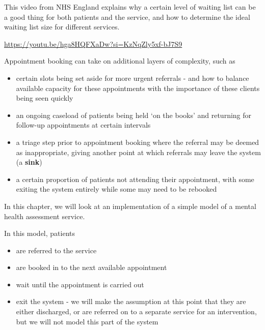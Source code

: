\documentclass[
  letterpaper,
  DIV=11,
  numbers=noendperiod]{scrreprt}
\providecommand{\tightlist}{%
  \setlength{\itemsep}{0pt}\setlength{\parskip}{0pt}}\usepackage{longtable,booktabs,array}
\begin{document}
\begin{tcolorbox}[enhanced jigsaw, rightrule=.15mm, colback=white, colframe=quarto-callout-note-color-frame, colbacktitle=quarto-callout-note-color!10!white, toprule=.15mm, coltitle=black, opacityback=0, titlerule=0mm, bottomtitle=1mm, breakable, title=\textcolor{quarto-callout-note-color}{\faInfo}\hspace{0.5em}{Note}, opacitybacktitle=0.6, toptitle=1mm, arc=.35mm, bottomrule=.15mm, leftrule=.75mm, left=2mm]

This video from NHS England explains why a certain level of waiting list
can be a good thing for both patients and the service, and how to
determine the ideal waiting list size for different services.

\url{https://youtu.be/hga8HQFXaDw?si=KzNqZly5xf-bJ7S9}

\end{tcolorbox}

Appointment booking can take on additional layers of complexity, such as

\begin{itemize}
\tightlist
\item
  certain slots being set aside for more urgent referrals - and how to
  balance available capacity for these appointments with the importance
  of these clients being seen quickly
\item
  an ongoing caseload of patients being held `on the books' and
  returning for follow-up appointments at certain intervals
\item
  a triage step prior to appointment booking where the referral may be
  deemed as inappropriate, giving another point at which referrals may
  leave the system (a \textbf{sink})
\item
  a certain proportion of patients not attending their appointment, with
  some exiting the system entirely while some may need to be rebooked
\end{itemize}

In this chapter, we will look at an implementation of a simple model of
a mental health assessment service.

In this model, patients

\begin{itemize}
\tightlist
\item
  are referred to the service
\item
  are booked in to the next available appointment
\item
  wait until the appointment is carried out
\item
  exit the system - we will make the assumption at this point that they
  are either discharged, or are referred on to a separate service for an
  intervention, but we will not model this part of the system
\end{itemize}
\end{document}
